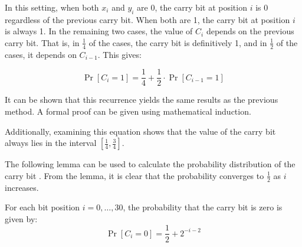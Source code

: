 \documentclass[runningheads]{llncs}
\begin{document}
In this setting, when both \( x_i \) and \( y_i \) are 0, the carry bit at position \( i \) is 0 regardless of the previous carry bit. When both are 1, the carry bit at position \( i \) is always 1. In the remaining two cases, the value of \( C_i \) depends on the previous carry bit. That is, in \( \frac{1}{4} \) of the cases, the carry bit is definitively 1, and in \( \frac{1}{2} \) of the cases, it depends on \( C_{i-1} \). This gives:

\begin{center}
\[
\Pr[C_i = 1] = \frac{1}{4} + \frac{1}{2} \cdot \Pr[C_{i-1} = 1]
\]
\end{center}

It can be shown that this recurrence yields the same results as the previous method. A formal proof can be given using mathematical induction.

Additionally, examining this equation shows that the value of the carry bit always lies in the interval \([ \frac{1}{4}, \frac{3}{4} ]\).

The following lemma can be used to calculate the probability distribution of the carry bit \cite{cho2007multiple}. From the lemma, it is clear that the probability converges to \( \frac{1}{2} \) as \( i \) increases.

\begin{lemma}
For each bit position \( i = 0, \dots, 30 \), the probability that the carry bit is zero is given by:
\[
\Pr[C_i = 0] = \frac{1}{2} + 2^{-i-2}
\]
\end{lemma}
\end{document}
